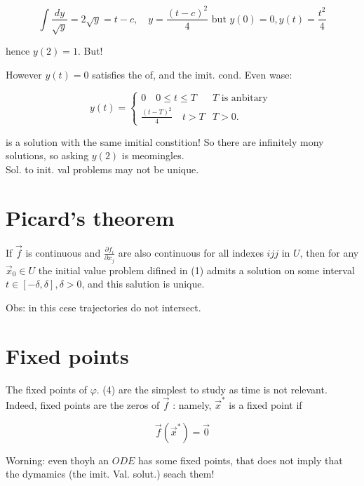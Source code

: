 \documentclass[10pt]{article}
\begin{document}
$$
\int \frac{d y}{\sqrt{y}}=2 \sqrt{y}=t-c, \quad y=\frac{(t-c)^{2}}{4} \text { but } y(0)=0, y(t)=\frac{t^{2}}{4}
$$

hence $y(2)=1$. But!

However $y(t)=0$ satisfies the of, and the imit. cond. Even wase:

$$
y(t)=\left\{\begin{array}{cc}
0 \quad 0 \leq t \leq T & T \text { is anbitary } \\
\frac{(t-T)^{2}}{4} \quad t>T & T>0 .
\end{array}\right.
$$

is a solution with the same imitial constition! So there are infinitely mony solutions, so asking $y(2)$ is meomingles.\\
Sol. to init. val problems may not be unique.

\section*{Picard's theorem}
If $\vec{f}$ is continuous and $\frac{\partial f_{i}}{\partial x_{j}}$ are also continuous for all indexes $i j j$ in $U$, then for any $\vec{x}_{0} \in U$ the initial value problem difined in (1) admits a solution on some interval $t \in[-\delta, \delta], \delta>0$, and this salution is unique.

Obs: in this cese trajectories do not intersect.

\section*{Fixed points}
The fixed points of $\varphi$. (4) are the simplest to study as time is not relevant. Indeed, fixed points are the zeros of $\vec{f}$ : namely, $\vec{x}^{*}$ is a fixed point if


\begin{equation*}
\vec{f}\left(\vec{x}^{*}\right)=\overrightarrow{0} \tag{3}
\end{equation*}


Worning: even thoyh an $O D E$ has some fixed points, that does not imply that the dymamics (the imit. Val. solut.) seach them!
\end{document}
